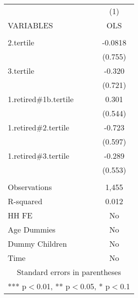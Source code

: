 \begin{tabular}{lc} \hline
 & (1) \\
VARIABLES & OLS \\ \hline
 &  \\
2.tertile & -0.0818 \\
 & (0.755) \\
3.tertile & -0.320 \\
 & (0.721) \\
1.retired\#1b.tertile & 0.301 \\
 & (0.544) \\
1.retired\#2.tertile & -0.723 \\
 & (0.597) \\
1.retired\#3.tertile & -0.289 \\
 & (0.553) \\
 &  \\
Observations & 1,455 \\
R-squared & 0.012 \\
HH FE & No \\
Age Dummies & No \\
Dummy Children & No \\
 Time & No \\ \hline
\multicolumn{2}{c}{ Standard errors in parentheses} \\
\multicolumn{2}{c}{ *** p$<$0.01, ** p$<$0.05, * p$<$0.1} \\
\end{tabular}
